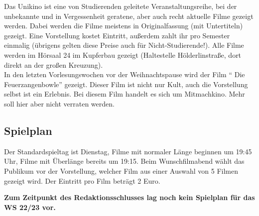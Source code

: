 Das Unikino ist eine von Studierenden geleitete Veranstaltungsreihe, bei der
unbekannte und in Vergessenheit geratene, aber auch recht aktuelle Filme
gezeigt werden. Dabei werden die Filme meistens in Originalfassung (mit
Untertiteln) gezeigt. Eine Vorstellung kostet  Eintritt, außerdem zahlt
ihr pro Semester einmalig  (übrigens gelten diese Preise auch für
Nicht-Studierende!). Alle Filme werden im Hörsaal 24 im Kupferbau gezeigt
(Haltestelle Hölderlinstraße, dort direkt an der großen Kreuzung).\\ 
In den letzten Vorlesungswochen vor der Weihnachtspause wird der Film 
"` Die Feu\-er\-zang\-en\-bow\-le"' gezeigt. Dieser Film ist nicht nur Kult,
auch die Vorstellung selbst ist ein Erlebnis. Bei diesem Film handelt es sich 
um Mitmachkino. Mehr soll hier aber nicht verraten werden.


\vspace*{-1em}

\subsection*{Spielplan}
Der Standardspieltag ist Dienstag, Filme mit normaler Länge beginnen um 19:45
Uhr, Filme mit Überlänge bereits um 19:15. Beim Wunschfilmabend wählt das
Publikum vor der Vorstellung, welcher Film aus einer Auswahl von 5 Filmen
gezeigt wird. Der Eintritt pro Film beträgt 2 Euro. 

\renewcommand{\arraystretch}{1.2}

\textbf{Zum Zeitpunkt des Redaktionsschlusses lag noch kein Spielplan für das
        WS 22/23 vor.}

